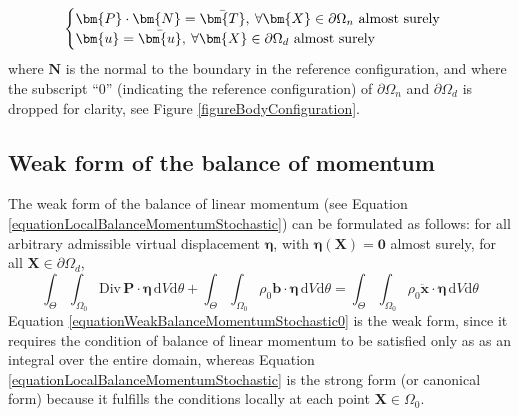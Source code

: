 \documentclass[oneside,11pt,times]{book}
\begin{document}
\begin{equation}
\begin{cases}
\bm{P}\cdot\bm{N}=\bar{\bm{T}}, \: \forall \bm{X} \in \partial \Omega_n \ \textnormal{almost surely} \\
\bm{u}=\bar{\bm{u}}, \: \forall \bm{X} \in \partial \Omega_d \ \textnormal{almost surely}\\
\end{cases}
\label{boundaryconditions}
\end{equation}
where $\bm{N}$ is the normal to the boundary in the reference configuration, and where the subscript ``$0$'' (indicating the reference configuration) of $\partial \Omega_n$ and $\partial \Omega_d$ is dropped for clarity, see Figure \ref{figureBodyConfiguration}.

\subsection{Weak form of the balance of momentum}
 \label{subsectionWeakFormMomentum}

The weak form of the balance of linear momentum (see Equation \eqref{equationLocalBalanceMomentumStochastic}) can be formulated as follows: for all arbitrary admissible virtual displacement $\bm{\eta}$, with $\bm{\eta}(\bm{X}) = \bm{0}$ almost surely, for all  $\bm{X} \in \partial \Omega_{d}$,
%
\begin{equation} \label{equationWeakBalanceMomentumStochastic0}
\int_{\Theta} \int_{\Omega_0} \text{Div} \, \bm{P} \cdot \bm{\eta} \, \text{d} V\text{d}\theta + \int_{\Theta} \int_{\Omega_0} \rho_0 \bm{b} \cdot \bm{\eta}  \, \text{d} V \text{d}\theta= \int_{\Theta} \int_{\Omega_0} \rho_0 \ddot{\bm{x}} \cdot \bm{\eta}  \, \text{d} V \text{d}\theta
\end{equation}
%
Equation \eqref{equationWeakBalanceMomentumStochastic0} is the weak form, since it requires the condition of balance of linear momentum to be satisfied only as as an integral over the entire domain, whereas Equation \eqref{equationLocalBalanceMomentumStochastic} is the strong form (or canonical form) because it fulfills the conditions locally at each point $\bm{X} \in \Omega_0$.
\end{document}
